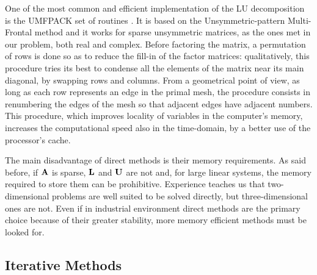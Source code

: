 One of the most common and efficient implementation of the LU
decomposition is the UMFPACK set of routines \cite{umfpack}. It is
based on the Unsymmetric-pattern Multi-Frontal method
\cite{amestoy_approximate} and it works for sparse unsymmetric matrices,
as the ones met in our problem, both real and complex. Before
factoring the matrix, a permutation of rows is done so as to reduce
the fill-in of the factor matrices: qualitatively, this procedure
tries its best to condense all the elements of the matrix near its
main diagonal, by swapping rows and columns. From a geometrical point
of view, as long as each row represents an edge in the primal mesh,
the procedure consists in renumbering the edges of the mesh so that
adjacent edges have adjacent numbers. This procedure, which improves
locality of variables in the computer's memory, increases the
computational speed also in the time-domain, by a better use of the
processor's cache.

The main disadvantage of direct methods is their memory
requirements. As said before, if $\mathbf{A}$ is sparse, $\mathbf{L}$
and $\mathbf{U}$ are not and, for large linear systems, the memory
required to store them can be prohibitive. Experience teaches us that
two-dimensional problems are well suited to be solved directly, but
three-dimensional ones are not. Even if in industrial environment
direct methods are the primary choice because of their greater
stability, more memory efficient methods must be looked for.


\subsection{Iterative Methods} 

